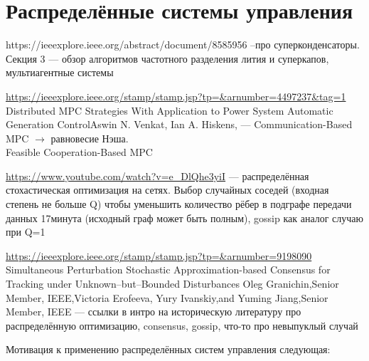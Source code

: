 \section{Распределённые системы управления}

https://ieeexplore.ieee.org/abstract/document/8585956 --про суперконденсаторы.
 Секция 3 --- обзор алгоритмов частотного разделения лития и суперкапов, мультиагентные системы

\url{https://ieeexplore.ieee.org/stamp/stamp.jsp?tp=&arnumber=4497237&tag=1}
Distributed MPC Strategies With Application to Power System Automatic Generation ControlAswin N. Venkat,  Ian A. Hiskens, 
--- Communication-Based MPC $\rightarrow$ равновесие Нэша.\\
Feasible Cooperation-Based MPC

\url{https://www.youtube.com/watch?v=e_DlQhe3yiI}
--- распределённая стохастическая оптимизация на сетях.
Выбор случайных соседей (входная степень не больше Q) чтобы уменьшить количество рёбер в подграфе передачи данных 17минута (исходный граф может быть полным), gossip как аналог случаю при Q=1

\url{https://ieeexplore.ieee.org/stamp/stamp.jsp?tp=&arnumber=9198090} Simultaneous Perturbation Stochastic Approximation-based Consensus for Tracking under Unknown–but–Bounded Disturbances Oleg Granichin,Senior Member, IEEE,Victoria Erofeeva, Yury Ivanskiy,and Yuming Jiang,Senior Member, IEEE --- ссылки в интро на историческую литературу про распределённую оптимизацию, consensus, gossip, что-то про невыпуклый случай

Мотивация к применению распределённых систем управления следующая:

